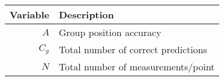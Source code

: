 \begin{tabular}{r|l}
Variable & Description \\ \hline
$A$ & Group position accuracy \\ 
$C_g$ & Total number of correct predictions \\ 
$N$ & Total number of measurements/point \\ 
\end{tabular}
